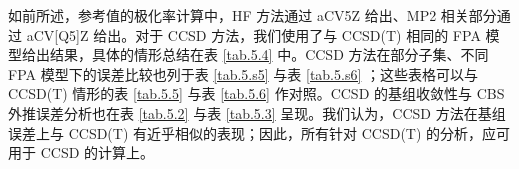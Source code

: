 如前所述，参考值的极化率计算中，HF 方法通过 aCV5Z 给出、MP2 相关部分通过 aCV[Q5]Z 给出。对于 CCSD 方法，我们使用了与 CCSD(T) 相同的 FPA 模型给出结果，具体的情形总结在表 \ref{tab.5.4} 中。CCSD 方法在部分子集、不同 FPA 模型下的误差比较也列于表 \ref{tab.5.s5} 与表 \ref{tab.5.s6} ；这些表格可以与 CCSD(T) 情形的表 \ref{tab.5.5} 与表 \ref{tab.5.6} 作对照。CCSD 的基组收敛性与 CBS 外推误差分析也在表 \ref{tab.5.2} 与表 \ref{tab.5.3} 呈现。我们认为，CCSD 方法在基组误差上与 CCSD(T) 有近乎相似的表现；因此，所有针对 CCSD(T) 的分析，应可用于 CCSD 的计算上。

\begin{table}[!th]
\centering
\caption[HF、MP2、CCSD 方法同性极化率的测评]{HF、MP2、CCSD 方法同性极化率的测评\textrm{\textsuperscript{\emph{a}}}。误差以相对方均根误差统计。}
\label{tab.5.7}
\end{table}

